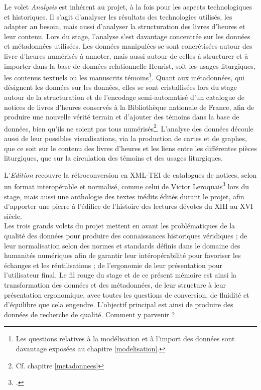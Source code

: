 \documentclass[a4paper,12pt,twoside]{book}
\begin{document}
Le volet \textit{Analysis} est inhérent au projet, à la fois pour les aspects technologiques et historiques. Il s'agit d'analyser les résultats des technologies utilisés, les adapter au besoin, mais aussi d'analyser la structuration des livres d'heures et leur contenu. Lors du stage, l'analyse s'est davantage concentrée sur les données et métadonnées utilisées. Les données manipulées se sont concrétisées autour des livre d'heures numérisés à annoter, mais aussi autour de celles à structurer et à importer dans la base de données relationnelle Heurist, soit les usages liturgiques, les contenus textuels ou les manuscrits témoins\footnote{Les questions relatives à la modélisation et à l'import des données sont davantage exposées au chapitre \ref{modelisation}.}. Quant aux métadonnées, qui désignent les données sur les données, elles se sont cristallisées lors du stage autour de la structuration et de l'encodage semi-automatisé d'un catalogue de notices de livres d'heures conservés à la Bibliothèque nationale de France, afin de produire une nouvelle vérité terrain et d'ajouter des témoins dans la base de données, bien qu'ils ne soient pas tous numérisés\footnote{Cf. chapitre \ref{metadonnees}}. L'analyse des données découle aussi de leur possibles visualisations, via la production de cartes et de graphes, que ce soit sur le contenu des livres d'heures et les liens entre les différentes pièces liturgiques, que sur la circulation des témoins et des usages liturgiques. 

L'\textit{Edition} recouvre la rétroconversion en XML-TEI de catalogues de notices, selon un format interopérable et normalisé, comme celui de Victor Leroquais\footcite{Leroquais_notices} lors du stage, mais aussi une anthologie des textes inédits édités durant le projet, afin d'apporter une pierre à l'édifice de l'histoire des lectures dévotes du \textsc{XIII} au \textsc{XVI} siècle. \\

Les trois grands volets du projet mettent en avant les problématiques de la qualité des données pour produire des connaissances historiques véridiques ; de leur normalisation selon des normes et standards définis dans le domaine des humanités numériques afin de garantir leur intéropérabilité pour favoriser les échanges et les réutilisations ; de l'ergonomie de leur présentation pour l'utilisateur final. Le fil rouge du stage et de ce présent mémoire est ainsi la transformation des données et des métadonnées, de leur structure à leur présentation ergonomique, avec toutes les questions de conversion, de fluidité et d’équilibre que cela engendre. L’objectif principal est ainsi de produire des données de recherche de qualité. Comment y parvenir ? \\
\end{document}
